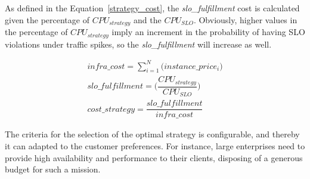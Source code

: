 As defined in the Equation~\ref{strategy_cost}, the \emph{slo\_fulfillment} cost is calculated given the percentage of \emph{$CPU_{strategy}$} and the \emph{$CPU_{SLO}$}. Obviously, higher values in the percentage of \emph{$CPU_{strategy}$} imply an increment in the probability of having SLO violations under traffic spikes, so the \emph{slo\_fulfillment} will increase as well. 



{\scriptsize
\begin{equation}\label{strategy_cost}
\begin{split}
infra\_cost = \sum_{i=1}^N \big( instance\_price_{i} \big) \\
slo\_fulfillment =  \bigg( \dfrac{ CPU_{strategy} } {CPU_{SLO}} \bigg)  \\
cost\_strategy = \dfrac{  slo\_fulfillment  } {infra\_cost}
\end{split}
\end{equation}
}


The criteria for the selection of the optimal strategy is configurable, and thereby it can adapted to the customer preferences. For instance, large enterprises need to provide high availability and performance to their clients, disposing of a generous budget for such a mission. 



